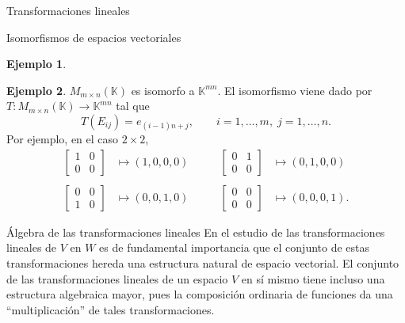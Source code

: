 \documentclass[a4paper,12pt,twoside,spanish,reqno]{amsbook}
\theoremstyle{definition}
\newtheorem{ejemplo}{Ejemplo}[section]
\theoremstyle{remark}
\newcommand{\K}{\mathbb K}
\begin{document}
\begin{chapter}{Transformaciones lineales}
\begin{section}{Isomorfismos de espacios vectoriales}
\begin{ejemplo}
    \end{ejemplo}

    \begin{ejemplo} $M_{m \times n}(\K)$  es isomorfo a $\K^{mn}$. El isomorfismo viene dado por $T: M_{m \times n}(\K) \to \K^{mn}$ tal que
        $$
        T(E_{ij}) = e_{(i-1)n+j}, \qquad i=1,\ldots, m,\; j=1,\ldots, n.
        $$
    Por  ejemplo, en el caso  $2 \times 2$,
    \begin{equation*}
    \begin{array}{llll}
    \begin{bmatrix} 1&0\\0&0\end{bmatrix} &\mapsto (1,0,0,0) \qquad&
    \begin{bmatrix} 0&1\\0&0\end{bmatrix} &\mapsto (0,1,0,0) \\
    &&&\\
    \begin{bmatrix} 0&0\\1&0\end{bmatrix} &\mapsto (0,0,1,0) &
    \begin{bmatrix} 0&0\\0&0\end{bmatrix} &\mapsto (0,0,0,1).
    \end{array}
    \end{equation*}	 
        
    \end{ejemplo}
    
        \end{section}
    
        \begin{section}{Álgebra de las transformaciones lineales}
            En el estudio de las transformaciones lineales de $V$ en $W$ es de fundamental importancia que el conjunto de estas transformaciones hereda una estructura natural de espacio vectorial. El conjunto de las transformaciones lineales de un espacio $V$ en sí mismo tiene incluso una estructura algebraica mayor, pues la composición ordinaria de funciones da una ``multiplicación'' de tales transformaciones. 
            

\end{section}
\end{chapter}
\end{document}
